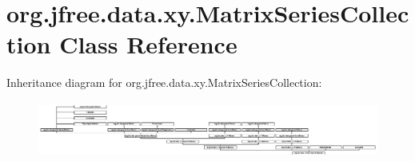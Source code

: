 \hypertarget{classorg_1_1jfree_1_1data_1_1xy_1_1_matrix_series_collection}{}\section{org.\+jfree.\+data.\+xy.\+Matrix\+Series\+Collection Class Reference}
\label{classorg_1_1jfree_1_1data_1_1xy_1_1_matrix_series_collection}
Inheritance diagram for org.\+jfree.\+data.\+xy.\+Matrix\+Series\+Collection\+:\begin{figure}[H]
\begin{center}
\leavevmode
\includegraphics[height=1.846154cm]{classorg_1_1jfree_1_1data_1_1xy_1_1_matrix_series_collection}
\end{center}
\end{figure}
